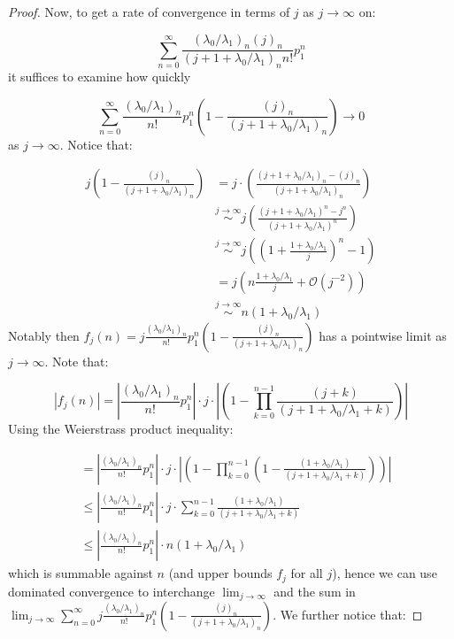 \documentclass{article}
\numberwithin{equation}{section}
\begin{document}
\begin{proof}
Now, to get a rate of convergence in terms of $j$ as $j\to\infty$ on:

\[\sum_{n=0}^\infty \frac{(\lambda_0/\lambda_1)_n(j)_n}{(j+1+\lambda_0/\lambda_1)_nn!}p_1^n\]
it suffices to examine how quickly

\[\sum_{n=0}^\infty \frac{(\lambda_0/\lambda_1)_n}{n!}p_1^n\left(1-\frac{(j)_n}{(j+1+\lambda_0/\lambda_1)_n}\right)\to 0\]
as $j\to\infty$. Notice that:


\begin{align*}
  j\left(1-\frac{(j)_n}{(j+1+\lambda_0/\lambda_1)_n}\right)&=j\cdot \left(\frac{(j+1+\lambda_0/\lambda_1)_n-(j)_n}{(j+1+\lambda_0/\lambda_1)_n}\right)\\
  &\overset{j\to\infty}{\sim} j\left(\frac{(j+1+\lambda_0/\lambda_1)^n-j^n}{(j+1+\lambda_0/\lambda_1)^n}\right)\\
  &\overset{j\to\infty}{\sim} j\left((1+\frac{1+\lambda_0/\lambda_1}{j})^n-1\right)\\
  &= j\left(n\frac{1+\lambda_0/\lambda_1}{j}+\mathcal{O}(j^{-2})\right)\\
  &\overset{j\to\infty}{\sim} n(1+\lambda_0/\lambda_1)
\end{align*}
Notably then $f_j(n)=j\frac{(\lambda_0/\lambda_1)_n}{n!}p_1^n\left(1-\frac{(j)_n}{(j+1+\lambda_0/\lambda_1)_n}\right)$ has a pointwise limit as $j\to\infty$. Note that:

\[|f_j(n)|=\left|\frac{(\lambda_0/\lambda_1)_n}{n!}p_1^n\right|\cdot j\cdot \left|\left(1-\prod_{k=0}^{n-1} \frac{(j+k)}{(j+1+\lambda_0/\lambda_1+k)}\right)\right|\]
Using the Weierstrass product inequality:

\begin{align*}
  &=|\frac{(\lambda_0/\lambda_1)_n}{n!}p_1^n|\cdot j\cdot |\left(1-\prod_{k=0}^{n-1} \left(1-\frac{(1+\lambda_0/\lambda_1)}{(j+1+\lambda_0/\lambda_1+k)}\right)\right)|\\
  &\leq |\frac{(\lambda_0/\lambda_1)_n}{n!}p_1^n|\cdot j\cdot \sum_{k=0}^{n-1}\frac{(1+\lambda_0/\lambda_1)}{(j+1+\lambda_0/\lambda_1+k)}\\
  &\leq |\frac{(\lambda_0/\lambda_1)_n}{n!}p_1^n|\cdot n(1+\lambda_0/\lambda_1)
\end{align*}
which is summable against $n$ (and upper bounds $f_j$ for all $j$), hence we can use dominated convergence to interchange $\lim_{j\to\infty}$ and the sum in $\lim_{j\to\infty}\sum_{n=0}^\infty j\frac{(\lambda_0/\lambda_1)_n}{n!}p_1^n\left(1-\frac{(j)_n}{(j+1+\lambda_0/\lambda_1)_n}\right)$. We further notice that:


\end{proof}
\end{document}
